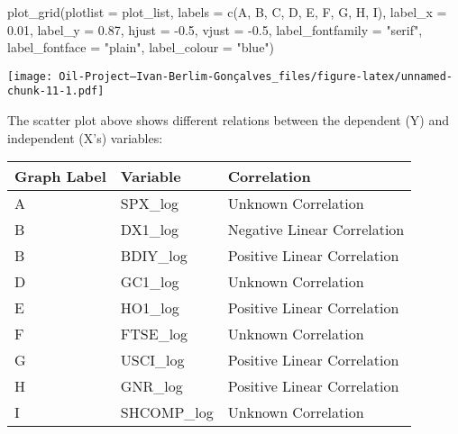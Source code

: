 \documentclass[
]{article}
\newenvironment{Shaded}{\begin{snugshade}}{\end{snugshade}}
\newcommand{\AttributeTok}[1]{\textcolor[rgb]{0.77,0.63,0.00}{#1}}
\newcommand{\FloatTok}[1]{\textcolor[rgb]{0.00,0.00,0.81}{#1}}
\newcommand{\FunctionTok}[1]{\textcolor[rgb]{0.00,0.00,0.00}{#1}}
\newcommand{\NormalTok}[1]{#1}
\newcommand{\SpecialCharTok}[1]{\textcolor[rgb]{0.00,0.00,0.00}{#1}}
\newcommand{\StringTok}[1]{\textcolor[rgb]{0.31,0.60,0.02}{#1}}
\begin{document}
\begin{Shaded}
\begin{Highlighting}[]
\FunctionTok{plot\_grid}\NormalTok{(}\AttributeTok{plotlist =}\NormalTok{ plot\_list,}
          \AttributeTok{labels =} \FunctionTok{c}\NormalTok{(}\StringTok{\textquotesingle{}A\textquotesingle{}}\NormalTok{, }\StringTok{\textquotesingle{}B\textquotesingle{}}\NormalTok{, }\StringTok{\textquotesingle{}C\textquotesingle{}}\NormalTok{, }\StringTok{\textquotesingle{}D\textquotesingle{}}\NormalTok{, }\StringTok{\textquotesingle{}E\textquotesingle{}}\NormalTok{, }\StringTok{\textquotesingle{}F\textquotesingle{}}\NormalTok{, }\StringTok{\textquotesingle{}G\textquotesingle{}}\NormalTok{, }\StringTok{\textquotesingle{}H\textquotesingle{}}\NormalTok{, }\StringTok{\textquotesingle{}I\textquotesingle{}}\NormalTok{),}
          \AttributeTok{label\_x =} \FloatTok{0.01}\NormalTok{,}
          \AttributeTok{label\_y =} \FloatTok{0.87}\NormalTok{,}
          \AttributeTok{hjust =} \SpecialCharTok{{-}}\FloatTok{0.5}\NormalTok{,}
          \AttributeTok{vjust =} \SpecialCharTok{{-}}\FloatTok{0.5}\NormalTok{,}
          \AttributeTok{label\_fontfamily =} \StringTok{"serif"}\NormalTok{,}
          \AttributeTok{label\_fontface =} \StringTok{"plain"}\NormalTok{,}
          \AttributeTok{label\_colour =} \StringTok{"blue"}\NormalTok{)}
\end{Highlighting}
\end{Shaded}

\texttt{[image: Oil-Project---Ivan-Berlim-Gonçalves\_files/figure-latex/unnamed-chunk-11-1.pdf]}

The scatter plot above shows different relations between the dependent
(Y) and independent (X's) variables:

\begin{longtable}[]{@{}lll@{}}
\toprule
Graph Label & Variable & Correlation \\
\midrule
\endhead
A & SPX\_log & Unknown Correlation \\
B & DX1\_log & Negative Linear Correlation \\
B & BDIY\_log & Positive Linear Correlation \\
D & GC1\_log & Unknown Correlation \\
E & HO1\_log & Positive Linear Correlation \\
F & FTSE\_log & Unknown Correlation \\
G & USCI\_log & Positive Linear Correlation \\
H & GNR\_log & Positive Linear Correlation \\
I & SHCOMP\_log & Unknown Correlation \\
\bottomrule
\end{longtable}
\end{document}
